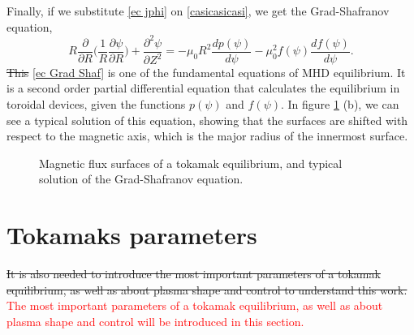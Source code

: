 \documentclass[a4paper,12pt,oneside]{book}
\newcommand{\p}{\partial}
\begin{document}
%
Finally, if we substitute \eqref{ec jphi} on \eqref{casicasicasi}, we get the Grad-Shafranov equation,
%
\begin{equation} \label{ec Grad Shaf}
R \dfrac{\p }{\p R} \Big( \dfrac{1}{R} \dfrac{\p \psi}{\p R} \Big) +\dfrac{\p^2 \psi}{\p Z^2}=-\mu_0 R^2 \dfrac{d p(\psi)}{d \psi} -\mu_0^2 f( \psi) \dfrac{d f(\psi)}{d \psi}.
\end{equation}
%
\st{This} \textcolor{red}{\eqref{ec Grad Shaf}} is one of the fundamental equations of MHD equilibrium. It is a second order partial differential equation that calculates the equilibrium in toroidal devices, given the functions $p(\psi)$ and $f(\psi)$. In figure \ref{nested and sol grad} (b), we can see a typical solution of this equation, showing that the surfaces are shifted with respect to the magnetic axis, which is the major radius of the innermost surface.

\begin{figure}
\centering
{}
\hspace{5cm}

\caption{Magnetic flux surfaces of a tokamak equilibrium, and typical solution of the Grad-Shafranov equation.}
\label{nested and sol grad}
\end{figure}





\section[Parameters]{Tokamaks parameters}
\label{sec Parameters}
\st{It is also needed to introduce the most important parameters of a tokamak equilibrium, as well as about plasma shape and control to understand this work.} \textcolor{red}{The most important parameters of a tokamak equilibrium, as well as about plasma shape and control will be introduced in this section.}
\end{document}
